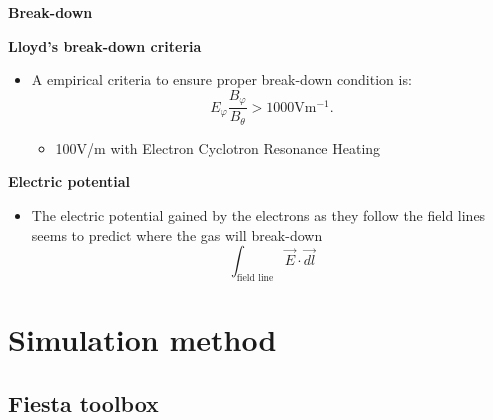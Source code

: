 \documentclass[10pt]{beamer}
\begin{document}
\begin{frame}{\bf Break-down}

	\begin{block}{\bf Lloyd's break-down criteria}
		\begin{itemize}
			\item A empirical criteria to ensure proper break-down condition is:
			\begin{equation}
E_\varphi \dfrac{B_\varphi}{B_\theta} >1000 \text{V}\text{m}^{-1}.
			\end{equation}
			\begin{itemize}
				\item 100V/m with Electron Cyclotron Resonance Heating
			\end{itemize}
		\end{itemize}
	\end{block}
	\begin{block}{\bf Electric potential}	
		\begin{itemize}
			\item The electric potential gained by the electrons as they follow the field lines seems to predict where the gas will break-down
			\begin{equation}
		\int_\text{field line} \vec{E} \cdot \vec{dl}
			\end{equation}	
		\end{itemize}
	\end{block}
\end{frame}





\section{Simulation method}

\subsection{Fiesta toolbox}
\end{document}
